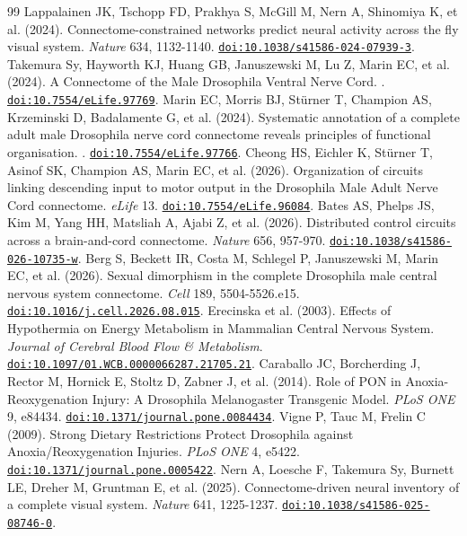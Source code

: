 \documentclass[11pt]{article}
\begin{document}
\begin{thebibliography}{99}
 Lappalainen JK, Tschopp FD, Prakhya S, McGill M, Nern A, Shinomiya K, et al. (2024). Connectome-constrained networks predict neural activity across the fly visual system. \emph{Nature} 634, 1132-1140. \href{https://doi.org/10.1038/s41586-024-07939-3}{\nolinkurl{doi:10.1038/s41586-024-07939-3}}.
 Takemura Sy, Hayworth KJ, Huang GB, Januszewski M, Lu Z, Marin EC, et al. (2024). A Connectome of the Male Drosophila Ventral Nerve Cord. \emph{}. \href{https://doi.org/10.7554/eLife.97769}{\nolinkurl{doi:10.7554/eLife.97769}}.
 Marin EC, Morris BJ, Stürner T, Champion AS, Krzeminski D, Badalamente G, et al. (2024). Systematic annotation of a complete adult male Drosophila nerve cord connectome reveals principles of functional organisation. \emph{}. \href{https://doi.org/10.7554/eLife.97766}{\nolinkurl{doi:10.7554/eLife.97766}}.
 Cheong HS, Eichler K, Stürner T, Asinof SK, Champion AS, Marin EC, et al. (2026). Organization of circuits linking descending input to motor output in the Drosophila Male Adult Nerve Cord connectome. \emph{eLife} 13. \href{https://doi.org/10.7554/eLife.96084}{\nolinkurl{doi:10.7554/eLife.96084}}.
 Bates AS, Phelps JS, Kim M, Yang HH, Matsliah A, Ajabi Z, et al. (2026). Distributed control circuits across a brain-and-cord connectome. \emph{Nature} 656, 957-970. \href{https://doi.org/10.1038/s41586-026-10735-w}{\nolinkurl{doi:10.1038/s41586-026-10735-w}}.
 Berg S, Beckett IR, Costa M, Schlegel P, Januszewski M, Marin EC, et al. (2026). Sexual dimorphism in the complete Drosophila male central nervous system connectome. \emph{Cell} 189, 5504-5526.e15. \href{https://doi.org/10.1016/j.cell.2026.08.015}{\nolinkurl{doi:10.1016/j.cell.2026.08.015}}.
 Erecinska et al. (2003). Effects of Hypothermia on Energy Metabolism in Mammalian Central Nervous System. \emph{Journal of Cerebral Blood Flow \& Metabolism}. \href{https://doi.org/10.1097/01.WCB.0000066287.21705.21}{\nolinkurl{doi:10.1097/01.WCB.0000066287.21705.21}}.
 Caraballo JC, Borcherding J, Rector M, Hornick E, Stoltz D, Zabner J, et al. (2014). Role of PON in Anoxia-Reoxygenation Injury: A Drosophila Melanogaster Transgenic Model. \emph{PLoS ONE} 9, e84434. \href{https://doi.org/10.1371/journal.pone.0084434}{\nolinkurl{doi:10.1371/journal.pone.0084434}}.
 Vigne P, Tauc M, Frelin C (2009). Strong Dietary Restrictions Protect Drosophila against Anoxia/Reoxygenation Injuries. \emph{PLoS ONE} 4, e5422. \href{https://doi.org/10.1371/journal.pone.0005422}{\nolinkurl{doi:10.1371/journal.pone.0005422}}.
 Nern A, Loesche F, Takemura Sy, Burnett LE, Dreher M, Gruntman E, et al. (2025). Connectome-driven neural inventory of a complete visual system. \emph{Nature} 641, 1225-1237. \href{https://doi.org/10.1038/s41586-025-08746-0}{\nolinkurl{doi:10.1038/s41586-025-08746-0}}.
\end{thebibliography}
\end{document}
